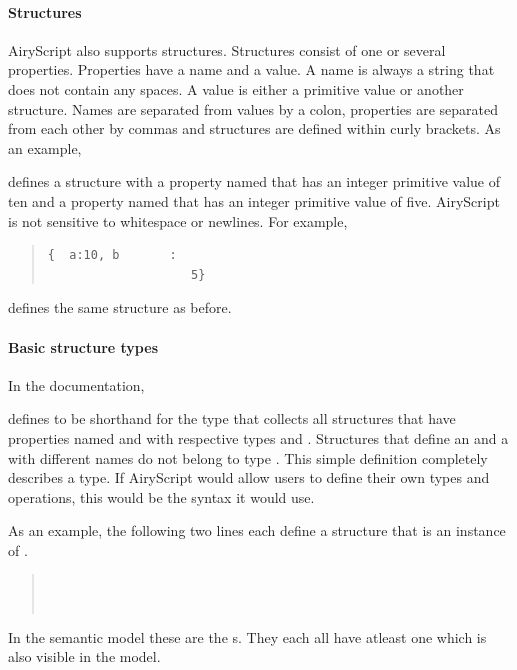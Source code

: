\paragraph{Structures}
AiryScript also supports structures. Structures consist of one or several
properties. Properties have a name and a value. A name is always a string that
does not contain any spaces. A value is either a primitive value or another
structure. Names are separated from values by a colon, properties are separated
from each other by commas and structures are defined within curly brackets. As
an example,
\begin{quote}
\end{quote}
defines a structure with a property named  that has an integer primitive
value of ten and a property named  that has an integer primitive value of
five. AiryScript is not sensitive to whitespace or newlines. For example,
\begin{quote}
  \begin{verbatim}
{  a:10, b       :
                    5}
  \end{verbatim}
\end{quote}
defines the same structure as before.


\paragraph{Basic structure types}
In the documentation,
\begin{quote}
\end{quote}
defines  to be shorthand for the type that collects all structures that
have properties named  and  with respective types  and
. Structures that define an  and a  with
different names do not belong to type . This simple definition completely
describes a type. If AiryScript would allow users to define their own types and
operations, this would be the syntax it would use.

As an example, the following two lines each define a structure that is an
instance of .
\begin{quote}
  \\
  \\
\end{quote}

In the semantic model these are the s. They each all
have atleast one  which is also visible in the model.

